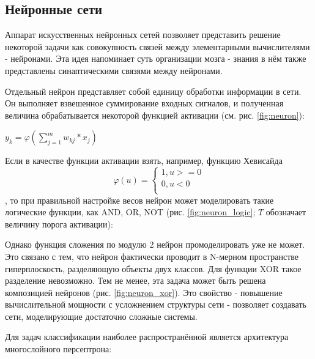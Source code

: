 
\subsection{Нейронные сети}


Аппарат искусственных нейронных сетей позволяет представить решение некоторой задачи как совокупность связей между элементарными вычислителями - нейронами. Эта идея напоминает суть организации мозга - знания в нём также представлены синаптическими связями между нейронами. 

Отдельный нейрон представляет собой единицу обработки информации в сети. Он выполняет взвешенное суммирование входных сигналов, и полученная величина обрабатывается некоторой функцией активации (см. рис. \ref{fig:neuron})\cite{haykin_nn}: 

$y_k=\varphi(\sum_{j=1}^m w_{kj}*x_j)$



Если в качестве функции активации взять, например, функцию Хевисайда 
\[
  \varphi(u)=\begin{cases}
               1, u>=0\\
               0, u<0 \\
              \end{cases}
\], то при правильной настройке весов нейрон может моделировать такие логические функции, как AND, OR, NOT (рис. \ref{fig:neuron_logic}\cite{neuron_logic}; $T$ обозначает величину порога активации):


Однако функция сложения по модулю 2 нейрон промоделировать уже не может. Это связано с тем, что нейрон фактически проводит в N-мерном пространстве гиперплоскость, разделяющую объекты двух классов. Для функции XOR такое разделение невозможно. Тем не менее, эта задача может быть решена композицией нейронов (рис. \ref{fig:neuron_xor}). Это свойство - повышение вычислительной мощности с усложнением структуры сети - позволяет создавать сети, моделирующие достаточно сложные системы. 



Для задач классификации наиболее распространённой является архитектура многослойного персептрона\cite{haykin_nn}:

